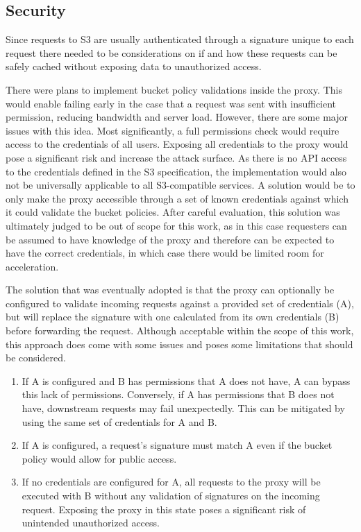 \subsection{Security}
\label{security}

Since requests to S3 are usually authenticated through a signature unique to each request there needed to be considerations on if and how these requests can be safely cached without exposing data to unauthorized access.

There were plans to implement bucket policy validations inside the proxy. This would enable failing early in the case that a request was sent with insufficient permission, reducing bandwidth and server load. However, there are some major issues with this idea.
Most significantly, a full permissions check would require access to the credentials of all users. Exposing all credentials to the proxy would pose a significant risk and increase the attack surface. As there is no API access to the credentials defined in the S3 specification, the implementation would also not be universally applicable to all S3-compatible services.
A solution would be to only make the proxy accessible through a set of known credentials against which it could validate the bucket policies. After careful evaluation, this solution was ultimately judged to be out of scope for this work, as in this case requesters can be assumed to have knowledge of the proxy and therefore can be expected to have the correct credentials, in which case there would be limited room for acceleration.

The solution that was eventually adopted is that the proxy can optionally be configured to validate incoming requests against a provided set of credentials (A), but will replace the signature with one calculated from its own credentials (B) before forwarding the request.
Although acceptable within the scope of this work, this approach does come with some issues and poses some limitations that should be considered. 
\begin{enumerate}
	\item If A is configured and B has permissions that A does not have, A can bypass this lack of permissions. Conversely, if A has permissions that B does not have, downstream requests may fail unexpectedly. This can be mitigated by using the same set of credentials for A and B.
	\item If A is configured, a request's signature must match A even if the bucket policy would allow for public access.
	\item If no credentials are configured for A, all requests to the proxy will be executed with B without any validation of signatures on the incoming request. Exposing the proxy in this state poses a significant risk of unintended unauthorized access.
\end{enumerate}


